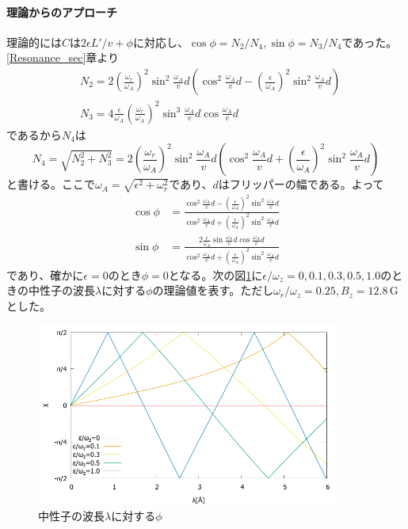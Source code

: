 \paragraph{理論からのアプローチ}
理論的には$C$は$2\epsilon L'/v +\phi$に対応し、$\cos\phi=N_2/N_4,\sin\phi=N_3/N_4$であった。\ref{Resonance_sec}章より
\begin{align}
&N_2 = 2\left(\frac{\omega_r}{\omega_A}\right)^2\sin^2\frac{\omega_A}{v}d \left(\cos^2 \frac{\omega_A}{v}d -\left(\frac{\epsilon}{\omega_A}\right)^2 \sin^2 \frac{\omega_A}{v}d\right) \\
&N_3 = 4\frac{\epsilon}{\omega_A} \left(\frac{\omega_r}{\omega_A}\right)^2\sin^3\frac{\omega_A}{v}d \cos \frac{\omega_A}{v}d
\end{align}
であるから$N_4$は
\begin{equation}
N_4=\sqrt{N_2^2+N_3^2}=2\left(\frac{\omega_r}{\omega_A}\right)^2\sin^2\frac{\omega_A}{v}d \left(\cos^2\frac{\omega_A}{v}d+\left(\frac{\epsilon}{\omega_A}\right)^2\sin^2\frac{\omega_A}{v}d\right)
\end{equation}
と書ける。ここで$\omega_A=\sqrt{\epsilon^2+\omega_r^2}$であり、$d$はフリッパーの幅である。よって
\begin{align}
\cos\phi&=\frac{\cos^2 \frac{\omega_A}{v}d -\left(\frac{\epsilon}{\omega_A}\right)^2 \sin^2 \frac{\omega_A}{v}d}{\cos^2\frac{\omega_A}{v}d+\left(\frac{\epsilon}{\omega_A}\right)^2\sin^2\frac{\omega_A}{v}d} \\
\sin\phi&=\frac{2\frac{\epsilon}{\omega_A}\sin\frac{\omega_A}{v}d \cos \frac{\omega_A}{v}d}{\cos^2\frac{\omega_A}{v}d+\left(\frac{\epsilon}{\omega_A}\right)^2\sin^2\frac{\omega_A}{v}d}
\end{align}
であり、確かに$\epsilon=0$のとき$\phi=0$となる。次の図\ref{analysis_fig_phi}に$\epsilon/\omega_z=0,0.1,0.3,0.5,1.0$のときの中性子の波長$\lambda$に対する$\phi$の理論値を表す。ただし$\omega_r/\omega_z=0.25,B_z=12.8\,\mathrm{G}$とした。
\begin{figure}[h]
\centering
\includegraphics[width=10cm]{analysis/C/chi.pdf}
\caption{中性子の波長$\lambda$に対する$\phi$} \label{analysis_fig_phi}
\end{figure}

